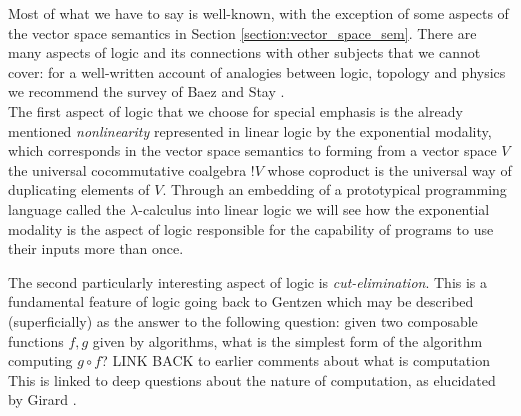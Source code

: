 \documentclass[english,letter paper,12pt,reqno]{article}
\theoremstyle{example}
\numberwithin{equation}{section}
\begin{document}
\vspace{0.5cm}

Most of what we have to say is well-known, with the exception of some aspects of the vector space semantics in Section \ref{section:vector_space_sem}. There are many aspects of logic and its connections with other subjects that we cannot cover: for a well-written account of analogies between logic, topology and physics we recommend the survey of Baez and Stay \cite{baez}.
\\

The first aspect of logic that we choose for special emphasis is the already mentioned \emph{nonlinearity} represented in linear logic by the exponential modality, which corresponds in the vector space semantics to forming from a vector space $V$ the universal cocommutative coalgebra ${!}V$ whose coproduct is the universal way of duplicating elements of $V$. Through an embedding of a prototypical programming language called the $\lambda$-calculus into linear logic we will see how the exponential modality is the aspect of logic responsible for the capability of programs to use their inputs more than once.


The second particularly interesting aspect of logic is \emph{cut-elimination}. This is a fundamental feature of logic going back to Gentzen \cite{gentzen} which may be described (superficially) as the answer to the following question: given two composable functions $f,g$ given by algorithms, what is the simplest form of the algorithm computing $g \circ f$? LINK BACK to earlier comments about what is computation This is linked to deep questions about the nature of computation, as elucidated by Girard \cite{girard_towards}.
\\
\end{document}
